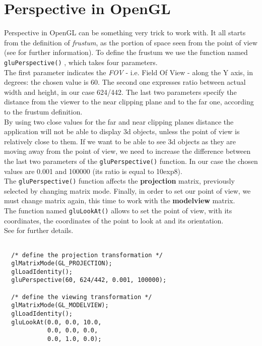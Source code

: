 \section{Perspective in OpenGL}
\label{opengl:perspective}

Perspective in OpenGL can be something very trick to work with. 
It all starts from the definition of \textit{frustum}, as the portion
of space seen from the point of view (see \cite{wiki:frustum} 
for further information). To define the frustum we use the function
named \texttt{gluPerspective()} \cite{opengl:gluPerspective}, which takes 
four parameters.
\\
The first parameter indicates the \textit{FOV} - i.e. Field Of View -
along the Y axis, in degrees: the chosen value is 60. The
second one expresses ratio between actual width and height, 
in our case 624/442. The last two parameters specify the distance 
from the viewer to the near clipping plane and to the far one, 
according to the frustum definition.
\\
By using two close values for the far and near clipping planes 
distance the application will not be able to display 3d
objects, unless the point of view is relatively close to them. 
If we want to be able to see 3d objects as they are moving away
from the point of view, we need to increase the difference between 
the last two parameters of the \texttt{gluPerspective()} function. In
our case the chosen values are 0.001 and 100000 (its ratio is 
equal to 10exp8).
\\
The \texttt{gluPerspective()} function affects the \textbf{projection} 
matrix, previously selected by changing matrix mode. Finally,
in order to set our point of view, we must change matrix again, 
this time to work with the \textbf{modelview} matrix.
\\
The function named
\texttt{gluLookAt()} allows to set the point of view, with its coordinates, 
the coordinates of the point to look at and its orientation.
\\
See \cite{opengl:gluLookAt} for further details.

\begin{lstlisting}[caption={OpenGL perspective example}, label={code:perspective}, frame=trBL]

  /* define the projection transformation */
  glMatrixMode(GL_PROJECTION);
  glLoadIdentity();
  gluPerspective(60, 624/442, 0.001, 100000);
  
  /* define the viewing transformation */
  glMatrixMode(GL_MODELVIEW);
  glLoadIdentity();
  gluLookAt(0.0, 0.0, 10.0,
            0.0, 0.0, 0.0,
            0.0, 1.0, 0.0);

\end{lstlisting}

